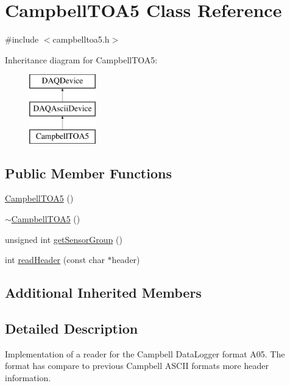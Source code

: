 \hypertarget{classCampbellTOA5}{\section{Campbell\-T\-O\-A5 Class Reference}
\label{classCampbellTOA5}
}


{\ttfamily \#include $<$campbelltoa5.\-h$>$}

Inheritance diagram for Campbell\-T\-O\-A5\-:\begin{figure}[H]
\begin{center}
\leavevmode
\includegraphics[height=3.000000cm]{classCampbellTOA5}
\end{center}
\end{figure}
\subsection*{Public Member Functions}
\begin{DoxyCompactItemize}
\item 
\hyperlink{classCampbellTOA5_ad53955c209a3f02a299989e03c47896e}{Campbell\-T\-O\-A5} ()
\item 
\hyperlink{classCampbellTOA5_a98f2239113ed206b37da17e24740da22}{$\sim$\-Campbell\-T\-O\-A5} ()
\item 
unsigned int \hyperlink{classCampbellTOA5_a97d66fcd7773a093d43f468e2998ae39}{get\-Sensor\-Group} ()
\item 
int \hyperlink{classCampbellTOA5_a3781a7ec4c685f52595aba01d46bad45}{read\-Header} (const char $\ast$header)
\end{DoxyCompactItemize}
\subsection*{Additional Inherited Members}


\subsection{Detailed Description}
Implementation of a reader for the Campbell Data\-Logger format A05. The format has compare to previous Campbell A\-S\-C\-I\-I formats more header information. 


